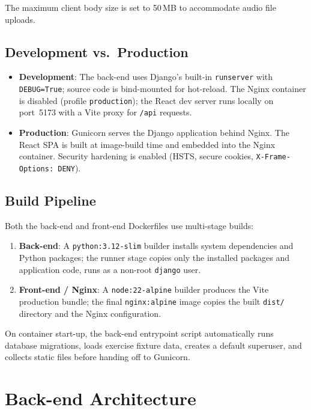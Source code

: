 \documentclass[12pt,a4paper]{article}
\begin{document}
The maximum client body size is set to 50\,MB to accommodate audio file uploads.

\subsection{Development vs.\ Production}

\begin{itemize}[nosep]
  \item \textbf{Development}: The back-end uses Django's built-in
    \texttt{runserver} with \texttt{DEBUG=True}; source code is bind-mounted for
    hot-reload. The Nginx container is disabled (profile \texttt{production});
    the React dev server runs locally on port~5173 with a Vite proxy for
    \texttt{/api} requests.
  \item \textbf{Production}: Gunicorn serves the Django application behind
    Nginx. The React SPA is built at image-build time and embedded into the
    Nginx container. Security hardening is enabled (HSTS, secure cookies,
    \texttt{X-Frame-Options: DENY}).
\end{itemize}

\subsection{Build Pipeline}

Both the back-end and front-end Dockerfiles use multi-stage builds:

\begin{enumerate}[nosep]
  \item \textbf{Back-end}: A \texttt{python:3.12-slim} builder installs system
    dependencies and Python packages; the runner stage copies only the installed
    packages and application code, runs as a non-root \texttt{django} user.
  \item \textbf{Front-end / Nginx}: A \texttt{node:22-alpine} builder produces
    the Vite production bundle; the final \texttt{nginx:alpine} image copies the
    built \texttt{dist/} directory and the Nginx configuration.
\end{enumerate}

On container start-up, the back-end entrypoint script automatically runs
database migrations, loads exercise fixture data, creates a default superuser,
and collects static files before handing off to Gunicorn.

\section{Back-end Architecture}
\label{sec:backend}
\end{document}
